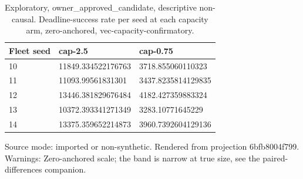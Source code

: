 {
\begin{table}[htbp]
\centering
\caption{Exploratory, owner\_approved\_candidate, descriptive non-causal. Deadline-success rate per seed at each capacity arm, zero-anchored, vec-capacity-confirmatory.}
\label{tab:traffictwin-metrics-6bfb8004f799}
\small
\renewcommand{\arraystretch}{1.15}
\begin{tabular}{lll}
\hline
Fleet seed & cap-2.5 & cap-0.75 \\
\hline
10 & 11849.334522176763 & 3718.855060110323 \\
11 & 11093.99561831301 & 3437.8235814129835 \\
12 & 13446.381829676484 & 4182.427359883324 \\
13 & 10372.393341271349 & 3283.10771645229 \\
14 & 13375.359652214873 & 3960.7392604129136 \\
\hline
\end{tabular}
\par\footnotesize
Source mode: imported or non-synthetic.
Rendered from projection 6bfb8004f799.
 Warnings: Zero-anchored scale; the band is narrow at true size, see the paired-differences companion.
\end{table}
}
